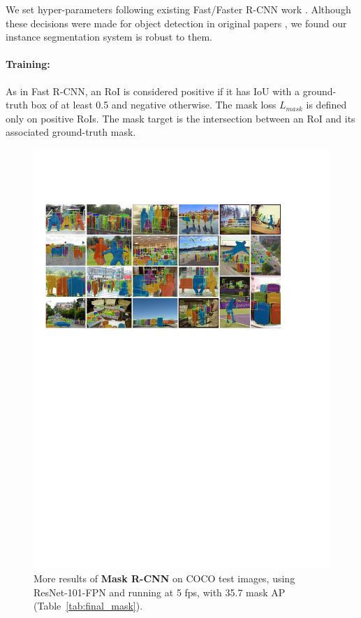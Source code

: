 \documentclass[10pt,twocolumn,letterpaper]{article}
\begin{document}
We set hyper-parameters following existing Fast/Faster R-CNN work \cite{Girshick2015a, Ren2015a, Lin2017}. Although these decisions were made for object detection in original papers \cite{Girshick2015a, Ren2015a, Lin2017}, we found our instance segmentation system is robust to them.

\paragraph{Training:} As in Fast R-CNN, an RoI is considered positive if it has IoU with a ground-truth box of at least 0.5 and negative otherwise. The mask loss $L_{mask}$ is defined only on positive RoIs. The mask target is the intersection between an RoI and its associated ground-truth mask.

\begin{figure}[t]
\centering
\includegraphics[width=1.0\linewidth]{ai/results_more}
\caption{More results of \textbf{Mask R-CNN} on COCO test images, using ResNet-101-FPN and running at 5 fps, with 35.7 mask AP (Table~\ref{tab:final_mask}).}
\label{fig:results_more}
\end{figure}
\end{document}
